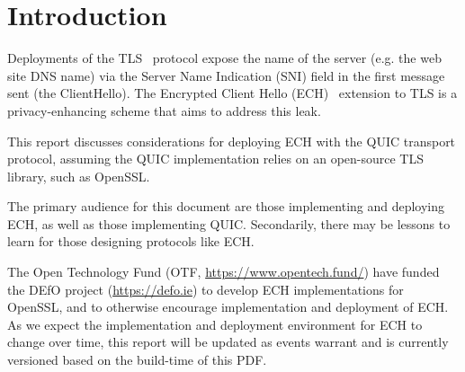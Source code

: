 \section{Introduction}

Deployments of the TLS~\cite{rfc8446} protocol
expose the name of the server (e.g. the web site DNS name) via the Server Name
Indication (SNI) field in the first message sent (the ClientHello).  The
Encrypted Client Hello (ECH)~\cite{draft-ietf-tls-esni} extension to TLS is a
privacy-enhancing scheme that aims to address this leak.

This report discusses considerations for deploying ECH with the QUIC transport protocol, assuming the QUIC implementation relies on an open-source TLS library, such as OpenSSL.

The primary audience for this document are those implementing and
deploying ECH, as well as those implementing QUIC. Secondarily, there may be lessons to learn for those
designing protocols like ECH.

The Open Technology Fund (OTF, \url{https://www.opentech.fund/}) have
funded the DEfO project (\url{https://defo.ie}) to develop
ECH implementations for OpenSSL, and to otherwise encourage implementation
and deployment of ECH.
As we expect the implementation and deployment environment for ECH to change
over time, this report will be updated as events warrant and is currently
versioned based on the build-time of this PDF.

